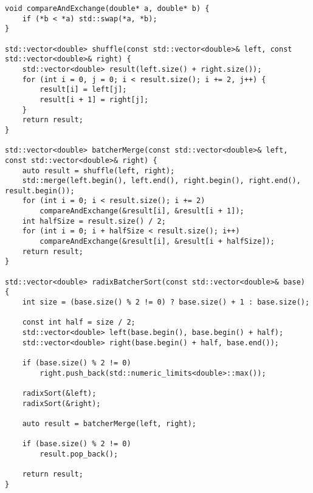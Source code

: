\documentclass[12pt,a4paper]{article}
\begin{document}
\begin{lstlisting}
void compareAndExchange(double* a, double* b) {
    if (*b < *a) std::swap(*a, *b);
}

std::vector<double> shuffle(const std::vector<double>& left, const std::vector<double>& right) {
    std::vector<double> result(left.size() + right.size());
    for (int i = 0, j = 0; i < result.size(); i += 2, j++) {
        result[i] = left[j];
        result[i + 1] = right[j];
    }
    return result;
}

std::vector<double> batcherMerge(const std::vector<double>& left, const std::vector<double>& right) {
    auto result = shuffle(left, right);
    std::merge(left.begin(), left.end(), right.begin(), right.end(), result.begin());
    for (int i = 0; i < result.size(); i += 2)
        compareAndExchange(&result[i], &result[i + 1]);
    int halfSize = result.size() / 2;
    for (int i = 0; i + halfSize < result.size(); i++)
        compareAndExchange(&result[i], &result[i + halfSize]);
    return result;
}

std::vector<double> radixBatcherSort(const std::vector<double>& base) {
    int size = (base.size() % 2 != 0) ? base.size() + 1 : base.size();

    const int half = size / 2;
    std::vector<double> left(base.begin(), base.begin() + half);
    std::vector<double> right(base.begin() + half, base.end());

    if (base.size() % 2 != 0)
        right.push_back(std::numeric_limits<double>::max());

    radixSort(&left);
    radixSort(&right);

    auto result = batcherMerge(left, right);

    if (base.size() % 2 != 0)
        result.pop_back();

    return result;
}

\end{lstlisting}
\end{document}
